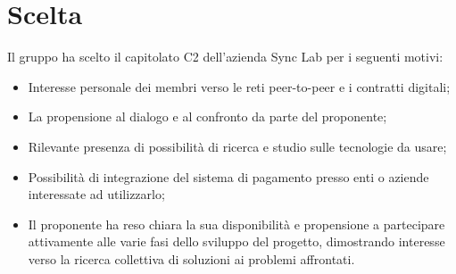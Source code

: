 \documentclass[a4paper, 12pt]{article}
\begin{document}
\makefrontpage

\makeversioni

\section{Scelta}\label{scelta}
Il gruppo ha scelto il capitolato C2 dell’azienda Sync Lab per i seguenti motivi:
\begin{itemize}
\item Interesse personale dei membri verso le reti peer-to-peer e i contratti digitali;
\item La propensione al dialogo e al confronto da parte del proponente;
\item Rilevante presenza di possibilità di ricerca e studio sulle tecnologie da usare;
\item Possibilità di integrazione del sistema di pagamento presso enti o aziende interessate ad utilizzarlo;
\item Il proponente ha reso chiara la sua disponibilità e propensione a partecipare attivamente alle varie fasi dello sviluppo del progetto, dimostrando interesse verso la ricerca collettiva di soluzioni ai problemi affrontati.
\end{itemize}
\end{document}
